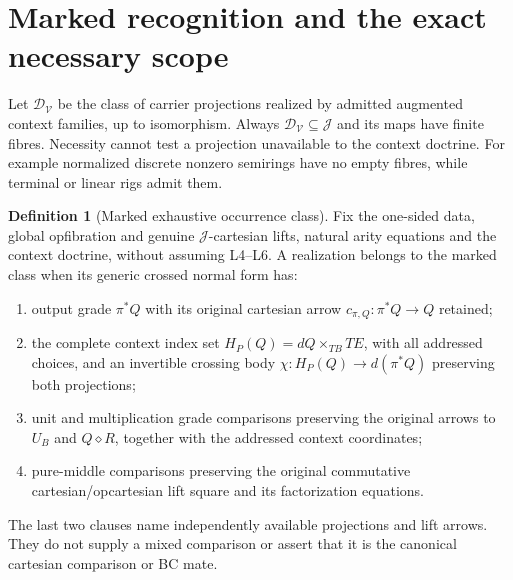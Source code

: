 \documentclass[11pt,a4paper]{article}
\theoremstyle{definition}
\newtheorem{definition}[theorem]{Definition}
\newcommand{\V}{\mathcal V}
\newcommand{\J}{\mathcal J}
\newcommand{\D}{\mathcal D_{\V}}
\newcommand{\diamondc}{\mathbin{\diamond}}
\begin{document}
\section{Marked recognition and the exact necessary scope}\label{sec:recognition}

Let $\D$ be the class of carrier projections realized by admitted augmented
context families, up to isomorphism. Always $\D\subseteq\J$ and its maps have
finite fibres. Necessity cannot test a projection unavailable to the context
doctrine. For example normalized discrete nonzero semirings have no empty
fibres, while terminal or linear rigs admit them.

\begin{definition}[Marked exhaustive occurrence class]\label{def:marked}
Fix the one-sided data, global opfibration and genuine $\J$-cartesian lifts,
natural arity equations and the
context doctrine, without assuming L4--L6. A realization belongs to the marked
class when its generic crossed normal form has:
\begin{enumerate}[label=\textup{(\roman*)}]
\item output grade $\pi^*Q$ with its original cartesian arrow
$c_{\pi,Q}:\pi^*Q\to Q$ retained;
\item the complete context index set
$H_P(Q)=dQ\times_{TB}TE$, with all addressed choices, and an invertible
crossing body $\chi:H_P(Q)\to d(\pi^*Q)$ preserving both projections;
\item unit and multiplication grade comparisons preserving the original
arrows to $U_B$ and $Q\diamondc R$, together with the addressed context
coordinates;
\item pure-middle comparisons preserving the original commutative
cartesian/opcartesian lift square and its factorization equations.
\end{enumerate}
The last two clauses name independently available projections and lift arrows.
They do not supply a mixed comparison or assert that it is the canonical
cartesian comparison or BC mate.
\end{definition}
\end{document}
